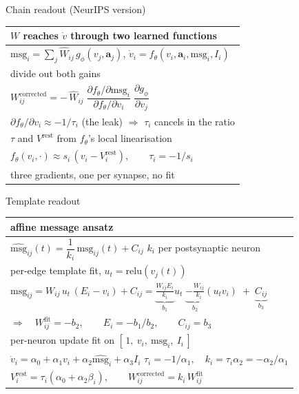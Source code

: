 \documentclass[aspectratio=169]{beamer}
\begin{document}
\begin{frame}{Chain readout \textnormal{\small(NeurIPS version)}}
\vspace*{0.4cm}
\centering\scriptsize
\begin{tabular}{@{}l@{}}
\toprule
$W$ reaches $\dot v$ through two learned functions \\
\midrule
$\mathrm{msg}_i = \sum_j \hat W_{ij}\, g_\phi(v_j, \mathbf{a}_j)$,
 \qquad $\dot v_i = f_\theta(v_i, \mathbf{a}_i, \mathrm{msg}_i, I_i)$ \\
\midrule
divide out both gains \\
\midrule
$W^{\mathrm{corrected}}_{ij}
 = -\,\hat W_{ij}\;
 \dfrac{\partial f_\theta/\partial \mathrm{msg}_i}
       {\partial f_\theta/\partial v_i}\;
 \dfrac{\partial g_\phi}{\partial v_j}$ \\[8pt]
$\partial f_\theta/\partial v_i \approx -1/\tau_i$ \quad(the leak)\quad
 $\Rightarrow$ \quad $\tau_i$ cancels in the ratio \\
\midrule
$\tau$ and $V^{\mathrm{rest}}$ from $f_\theta$'s local linearisation \\
\midrule
$f_\theta(v_i, \cdot) \approx s_i\,(v_i - V^{\mathrm{rest}}_i),
 \qquad \tau_i = -1/s_i$ \\
\midrule
three gradients, one per synapse, no fit \\
\bottomrule
\end{tabular}
\end{frame}

\begin{frame}{Template readout}
\vspace*{0.4cm}
\centering\scriptsize
\begin{tabular}{@{}l@{}}
\toprule
affine message ansatz \\
\midrule
$\widehat{\mathrm{msg}}_{ij}(t) = \dfrac{1}{k_i}\,\mathrm{msg}_{ij}(t) + C_{ij}$
 \qquad $k_i$ per postsynaptic neuron \\
\midrule
per-edge template fit, $u_t = \mathrm{relu}(v_j(t))$ \\
\midrule
$\mathrm{msg}_{ij} = W_{ij}\,u_t\,(E_i - v_i) + C_{ij}
 = \underbrace{\tfrac{W_{ij}E_i}{k_i}}_{b_1} u_t
 \;\underbrace{-\tfrac{W_{ij}}{k_i}}_{b_2} (u_t v_i)
 \;+\; \underbrace{C_{ij}}_{b_3}$ \\[6pt]
$\Rightarrow\quad W^{\mathrm{fit}}_{ij} = -b_2, \qquad E_i = -b_1/b_2, \qquad C_{ij} = b_3$ \\
\midrule
per-neuron update fit on $[\,1,\ v_i,\ \mathrm{msg}_i,\ I_i\,]$ \\
\midrule
$\dot v_i = \alpha_0 + \alpha_1 v_i + \alpha_2 \widehat{\mathrm{msg}}_i + \alpha_3 I_i$
 \qquad
$\tau_i = -1/\alpha_1, \quad k_i = \tau_i\alpha_2 = -\alpha_2/\alpha_1$ \\[6pt]
$V^{\mathrm{rest}}_i = \tau_i(\alpha_0 + \alpha_2\beta_i), \qquad
 W^{\mathrm{corrected}}_{ij} = k_i\,W^{\mathrm{fit}}_{ij}$ \\
\bottomrule
\end{tabular}
\end{frame}
\end{document}
